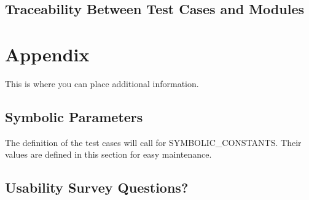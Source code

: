 \documentclass[12pt, titlepage]{article}
\begin{document}
\subsection{Traceability Between Test Cases and Modules}


				




\newpage

\section{Appendix}\label{sec_appendix}

This is where you can place additional information.

\subsection{Symbolic Parameters}

The definition of the test cases will call for SYMBOLIC\_CONSTANTS.
Their values are defined in this section for easy maintenance.

\subsection{Usability Survey Questions?}


\newpage{}
\end{document}
